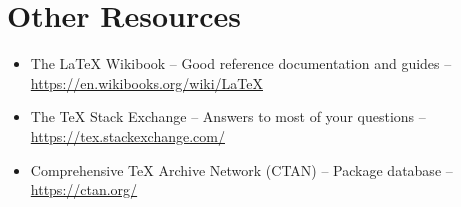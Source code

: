 \documentclass[11pt, twoside]{article}
\begin{document}
\newpage
\section{Other Resources}
\begin{itemize}
    \item The \LaTeX{} Wikibook -- Good reference documentation and guides -- \url{https://en.wikibooks.org/wiki/LaTeX}
    \item The \TeX{} Stack Exchange -- Answers to most of your questions -- \url{https://tex.stackexchange.com/}
    \item Comprehensive \TeX{} Archive Network (CTAN) -- Package database -- \url{https://ctan.org/}
\end{itemize}

\newpage
\printbibliography
\end{document}
